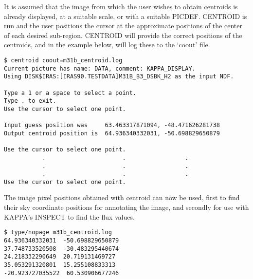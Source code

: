 It is assumed that the image from which the user wishes to obtain centroids is
already displayed, at a suitable scale, or with a suitable PICDEF. CENTROID is
run and the user positions the cursor at the approximate positions of
the center of each desired sub-region. CENTROID will provide the correct
positions of the centroids, and in the example below, will log these to the
`coout' file.
\begin{small}
\begin{verbatim}
$ centroid coout=m31b_centroid.log
Current picture has name: DATA, comment: KAPPA_DISPLAY.
Using DISK$IRAS:[IRAS90.TESTDATA]M31B_B3_DSBK_H2 as the input NDF.

Type a 1 or a space to select a point.
Type . to exit.
Use the cursor to select one point.

Input guess position was     63.463317871094, -48.471626281738
Output centroid position is  64.936340332031, -50.698829650879

Use the cursor to select one point.
           .                      .                 .
           .                      .                 .
           .                      .                 .
Use the cursor to select one point.
\end{verbatim}
\end{small}

The image pixel positions obtained with centroid can now be used, first to
find their sky coordinate positions for annotating the image, and secondly
for use with KAPPA's INSPECT to find the flux values.
\begin{small}
\begin{verbatim}
$ type/nopage m31b_centroid.log
64.936340332031  -50.698829650879  
37.748733520508  -30.483295440674  
24.218332290649  20.719131469727  
35.053291320801  15.255108833313  
-20.923727035522  60.530906677246  
\end{verbatim}
\end{small}


